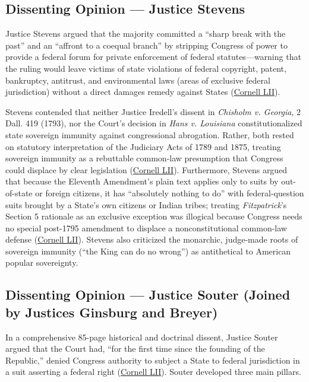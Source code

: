 \documentclass[12pt]{article}
\begin{document}
\subsection{Dissenting Opinion --- Justice Stevens}

Justice Stevens argued that the majority committed a ``sharp break with the past'' and an ``affront to a coequal branch'' by stripping Congress of power to provide a federal forum for private enforcement of federal statutes---warning that the ruling would leave victims of state violations of federal copyright, patent, bankruptcy, antitrust, and environmental laws (areas of exclusive federal jurisdiction) without a direct damages remedy against States (\href{https://www.law.cornell.edu/supct/html/94-12.ZD.html}{Cornell LII}).

Stevens contended that neither Justice Iredell's dissent in \textit{Chisholm v. Georgia}, 2 Dall. 419 (1793), nor the Court's decision in \textit{Hans v. Louisiana} constitutionalized state sovereign immunity against congressional abrogation. Rather, both rested on statutory interpretation of the Judiciary Acts of 1789 and 1875, treating sovereign immunity as a rebuttable common-law presumption that Congress could displace by clear legislation (\href{https://www.law.cornell.edu/supct/html/94-12.ZD.html}{Cornell LII}). Furthermore, Stevens argued that because the Eleventh Amendment's plain text applies only to suits by out-of-state or foreign citizens, it has ``absolutely nothing to do'' with federal-question suits brought by a State's own citizens or Indian tribes; treating \textit{Fitzpatrick}'s Section 5 rationale as an exclusive exception was illogical because Congress needs no special post-1795 amendment to displace a nonconstitutional common-law defense (\href{https://www.law.cornell.edu/supct/html/94-12.ZD.html}{Cornell LII}). Stevens also criticized the monarchic, judge-made roots of sovereign immunity (``the King can do no wrong'') as antithetical to American popular sovereignty.

\subsection{Dissenting Opinion --- Justice Souter (Joined by Justices Ginsburg and Breyer)}

In a comprehensive 85-page historical and doctrinal dissent, Justice Souter argued that the Court had, ``for the first time since the founding of the Republic,'' denied Congress authority to subject a State to federal jurisdiction in a suit asserting a federal right (\href{https://www.law.cornell.edu/supct/html/94-12.ZD1.html}{Cornell LII}). Souter developed three main pillars.
\end{document}
